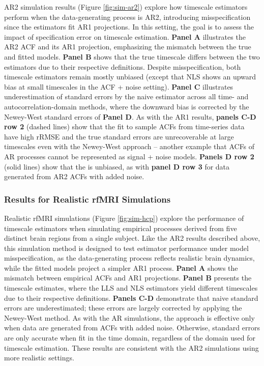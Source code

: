 \documentclass[latex/main.tex]{subfiles}
\begin{document}
AR2 simulation results (Figure \ref{fig:sim-ar2}) explore how timescale estimators perform when the data-generating process is AR2, introducing misspecification since the estimators fit AR1 projections. In this setting, the goal is to assess the impact of specification error on timescale estimation. \textbf{Panel A} illustrates the AR2 ACF and its AR1 projection, emphasizing the mismatch between the true and fitted models. \textbf{Panel B} shows that the true timescale differs between the two estimators due to their respective definitions. Despite misspecification, both timescale estimators remain mostly unbiased (except that NLS shows an upward bias at small timescales in the ACF + noise setting). \textbf{Panel C} illustrates underestimation of standard errors by the naive estimator across all time- and autocorrelation-domain methods, where the downward bias is corrected by the Newey-West standard errors of \textbf{Panel D}. As with the AR1 results, \textbf{panels C-D row 2} (dashed lines) show that the  fit to sample ACFs from time-series data have high rRMSE and the true standard errors are unrecoverable at large timescales even with the Newey-West approach -- another example that ACFs of AR processes cannot be represented as signal + noise models. \textbf{Panels D row 2} (solid lines) show that the  is unbiased, as with  \textbf{panel D row 3} for data generated from AR2 ACFs with added noise.


\subsubsection{Results for Realistic rfMRI Simulations}

Realistic rfMRI simulations (Figure \ref{fig:sim-hcp}) explore the performance of timescale estimators when simulating empirical processes derived from five distinct brain regions from a single subject. Like the AR2 results described above, this simulation method is designed to test estimator performance under model misspecification, as the data-generating process reflects realistic brain dynamics, while the fitted models project a simpler AR1 process. \textbf{Panel A} shows the mismatch between empirical ACFs and AR1 projections. \textbf{Panel B} presents the timescale estimates, where the LLS and NLS estimators yield different timescales due to their respective definitions. \textbf{Panels C-D} demonstrate that naive standard errors are underestimated; these errors are largely corrected by applying the Newey-West method. As with the AR simulations, the  approach is effective only when data are generated from ACFs with added noise. Otherwise, standard errors are only accurate when fit in the time domain, regardless of the domain used for timescale estimation. These results are consistent with the AR2 simulations using more realistic settings.\\
\end{document}
